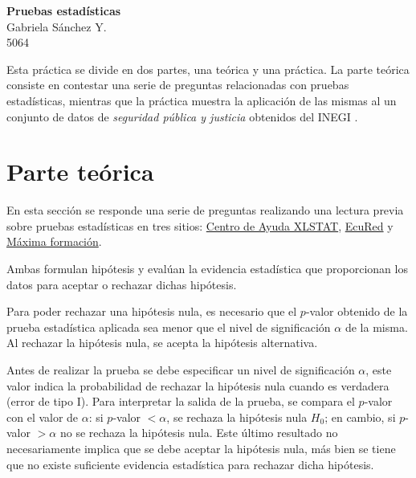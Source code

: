 \documentclass[12pt]{article}
\begin{document}
	\thispagestyle{empty}

	\begin{center}
		{\Large \bf Pruebas estadísticas}\\
		Gabriela S\'anchez Y.\\
		5064
	\end{center}
 
	Esta práctica se divide en dos partes, una teórica y una práctica. La parte teórica consiste en contestar una serie de preguntas relacionadas con pruebas estadísticas, mientras que la práctica muestra la aplicación de las mismas al un conjunto de datos de {\em seguridad pública y justicia} obtenidos del INEGI \cite{inegi}. 


	\section{Parte teórica}
	
	En esta sección se responde una serie de preguntas realizando una lectura previa sobre pruebas estadísticas en tres sitios: \href{https://help.xlstat.com/s/article/que-es-una-prueba-estadistica?language=es#:~:text=Una\%20prueba\%20estad\%C3\%ADstica\%20es\%20una,nula\%2C\%20y\%20suele\%20denominarse\%20H0.&text=H0\%20normalmente\%20se\%20opone\%20a,alternativa\%2C\%20denominada\%20H1\%20o\%20Ha}{Centro de Ayuda XLSTAT}, \href{https://www.ecured.cu/Pruebas_estad\%C3\%ADsticas}{EcuRed} y \href{https://www.maximaformacion.es/blog-dat/guia-para-encontrar-tu-prueba-estadistica/}{Máxima formación}.
	
	
	Ambas formulan hipótesis y evalúan la evidencia estadística que proporcionan los datos para aceptar o rechazar dichas hipótesis. 
	
	
	Para poder rechazar una hipótesis nula, es necesario que el $p$-valor obtenido de la prueba estadística aplicada sea menor que el nivel de significación $\alpha$ de la misma. Al rechazar la hipótesis nula, se acepta la hipótesis alternativa.
	
	
	
	Antes de realizar la prueba se debe especificar un nivel de significación $\alpha$, este valor indica la probabilidad de rechazar la hipótesis nula cuando es verdadera (error de tipo I). Para interpretar la salida de la prueba, se compara el $p$-valor con el valor de $\alpha$: si $p$-valor $< \alpha$, se rechaza la hipótesis nula $H_0$; en cambio, si $p$-valor $> \alpha$ no se rechaza la hipótesis nula. Este último resultado no necesariamente implica que se debe aceptar la hipótesis nula, más bien se tiene que no existe suficiente evidencia estadística para rechazar dicha hipótesis.
	
\end{document}
